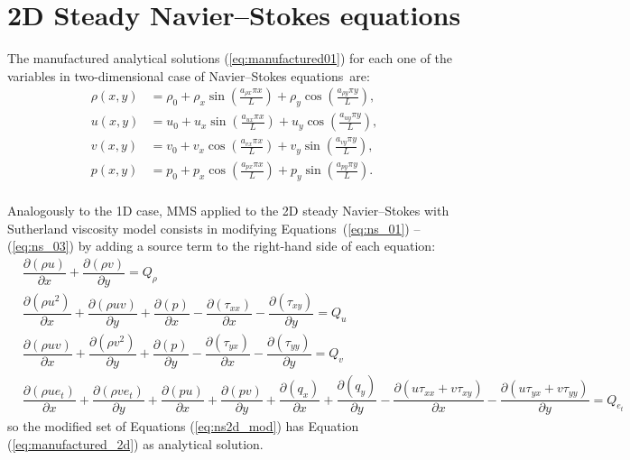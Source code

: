 \documentclass[10pt]{article}
\newcommand{\Diff}[2] {\dfrac{\partial( #1)}{\partial #2}}
\begin{document}
 \section{2D Steady Navier--Stokes equations}
The manufactured analytical solutions (\ref{eq:manufactured01}) for each one of the variables in two-dimensional case of Navier--Stokes equations~are:
\begin{equation}
\begin{split}
\label{eq:manufactured_2d}
\rho\left(x,y\right) &=  \rho_{0}+ \rho_{x} \sin\left(\frac{a_{ \rho x} \pi x}{L}\right)+ \rho_{y} \cos\left(\frac{a_{ \rho y} \pi y}{L}\right),\\
u\left(x,y\right) &= u_{0}+u_{x} \sin\left(\frac{a_{u x} \pi x}{L}\right)+u_{y} \cos\left(\frac{a_{u y} \pi y}{L}\right),\\
v\left(x,y\right) &= v_{0}+v_{x} \cos\left(\frac{a_{v x} \pi x}{L}\right)+v_{y} \sin\left(\frac{a_{v y} \pi y}{L}\right),\\
p\left(x,y\right) &= p_{0}+p_{x} \cos\left(\frac{a_{p x} \pi x}{L}\right)+p_{y} \sin\left(\frac{a_{p y} \pi y}{L}\right).\\
\end{split}
\end{equation}


Analogously to the 1D case, MMS applied to the 2D steady Navier--Stokes with Sutherland viscosity model  consists in modifying Equations~(\ref{eq:ns_01}) -- (\ref{eq:ns_03}) by adding a source term to the right-hand side of each equation:
\begin{equation}
\begin{split}
\label{eq:ns2d_mod}
& \Diff{\rho u}{x}+\Diff{\rho v}{y} = Q_\rho\\
& \Diff{\rho u^2 }{x}+\Diff{\rho uv}{y} +\Diff{p}{x}-\Diff{\tau_{xx}}{x}-\Diff{\tau_{xy}}{y}= Q_u\\
& \Diff{\rho uv}{x}+\Diff{\rho v^2}{y} +\Diff{p}{y}-\Diff{\tau_{yx}}{x}-\Diff{\tau_{yy}}{y}= Q_v\\
& \Diff{\rho ue_t }{x}+\Diff{\rho ve_t}{y}+\Diff{pu}{x} +\Diff{pv}{y}+\Diff{q_x}{x}+\Diff{q_y}{y}-\Diff{u\tau_{xx}+v\tau_{xy}}{x}-\Diff{u\tau_{yx}+v\tau_{yy}}{y}= Q_{e_t}
\end{split}
\end{equation}
so the modified set of Equations (\ref{eq:ns2d_mod}) has Equation (\ref{eq:manufactured_2d}) as analytical solution.
\end{document}
